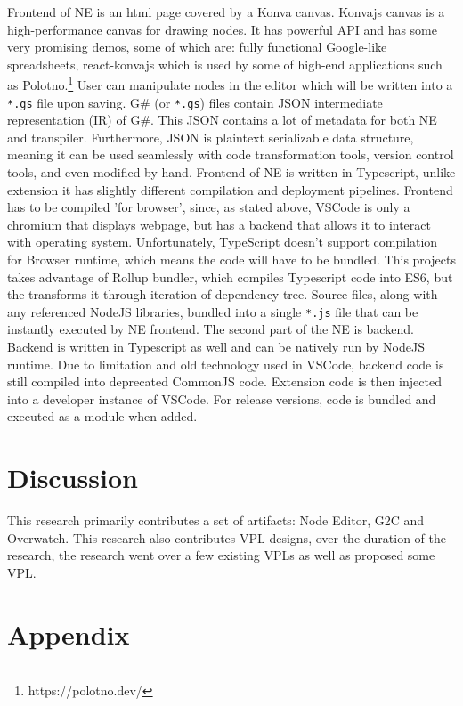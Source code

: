 \documentclass{article}
\begin{document}
Frontend of NE is an html page covered by a Konva canvas. Konvajs canvas is a high-performance canvas for drawing nodes. It has powerful API and has some very promising demos, some of which are: fully functional Google-like spreadsheets, react-konvajs which is used by some of high-end applications such as Polotno.\footnote{https://polotno.dev/}
User can manipulate nodes in the editor which will be written into a \lstinline[columns=fixed]{*.gs} file upon saving. G\# (or \lstinline[columns=fixed]{*.gs}) files contain JSON intermediate representation (IR) of G\#. This JSON contains a lot of metadata for both NE and transpiler. Furthermore, JSON is plaintext serializable data structure, meaning it can be used seamlessly with code transformation tools, version control tools, and even modified by hand.
Frontend of NE is written in Typescript, unlike extension it has slightly different compilation and deployment pipelines. Frontend has to be compiled 'for browser', since, as stated above, VSCode is only a chromium that displays webpage, but has a backend that allows it to interact with operating system. Unfortunately, TypeScript doesn't support compilation for Browser runtime, which means the code will have to be bundled. This projects takes advantage of Rollup bundler, which compiles Typescript code into ES6, but the transforms it through iteration of dependency tree. Source files, along with any referenced NodeJS libraries, bundled into a single \lstinline[columns=fixed]{*.js} file that can be instantly executed by NE frontend.
The second part of the NE is backend. Backend is written in Typescript as well and can be natively run by NodeJS runtime. Due to limitation and old technology used in VSCode, backend code is still compiled into deprecated CommonJS code. Extension code is then injected into a developer instance of VSCode. For release versions, code is bundled and executed as a module when added.

\section{Discussion}
This research primarily contributes a set of artifacts: Node Editor, G2C and Overwatch. This research also contributes VPL designs, over the duration of the research, the research went over a few existing VPLs as well as proposed some VPL.







\section{Appendix}


\pagebreak


\end{document}
